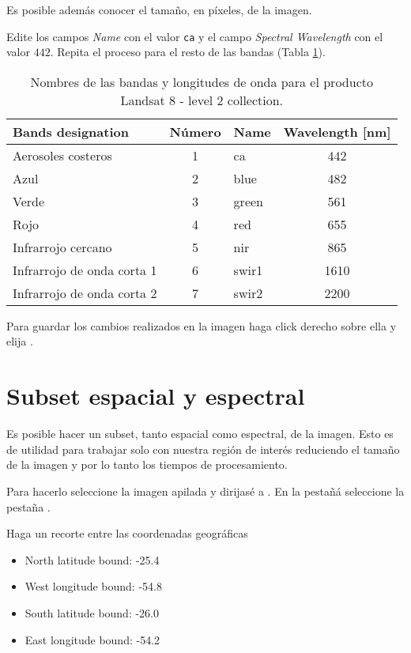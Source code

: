 Es posible además conocer el tamaño, en píxeles, de la imagen.

Edite los campos \emph{Name} con el valor \texttt{ca} y el campo \emph{Spectral Wavelength} con el valor $442$. Repita el proceso para el resto de las bandas (Tabla \ref{tab:landsat8}).

\begin{table}[h!]
  \centering
  \begin{tabular}{@{}lclc@{}}
  \toprule
  Bands designation          & Número & Name  & Wavelength {[}nm{]} \\ \midrule
  Aerosoles costeros         & 1      & ca    & 442                 \\
  Azul                       & 2      & blue  & 482                 \\
  Verde                      & 3      & green & 561                 \\
  Rojo                       & 4      & red   & 655                 \\
  Infrarrojo cercano         & 5      & nir   & 865                 \\
  Infrarrojo de onda corta 1 & 6      & swir1 & 1610                \\
  Infrarrojo de onda corta 2 & 7      & swir2 & 2200                \\ \bottomrule
  \end{tabular}
\caption{Nombres de las bandas y longitudes de onda para el producto Landsat 8 - level 2 collection.}
\label{tab:landsat8}
\end{table}

Para guardar los cambios realizados en la imagen haga click derecho sobre ella y elija .

\section{Subset espacial y espectral}
Es posible hacer un subset, tanto espacial como espectral, de la imagen. Esto es de utilidad para trabajar solo con nuestra región de interés reduciendo el tamaño de la imagen y por lo tanto los tiempos de procesamiento.

Para hacerlo seleccione la imagen apilada y dirijasé a . En la pestañá  seleccione la pestaña .

Haga un recorte entre las coordenadas geográficas
\begin{itemize}
    \item North latitude bound: -25.4
    \item West longitude bound: -54.8
    \item South latitude bound: -26.0
    \item East longitude bound: -54.2
\end{itemize}

